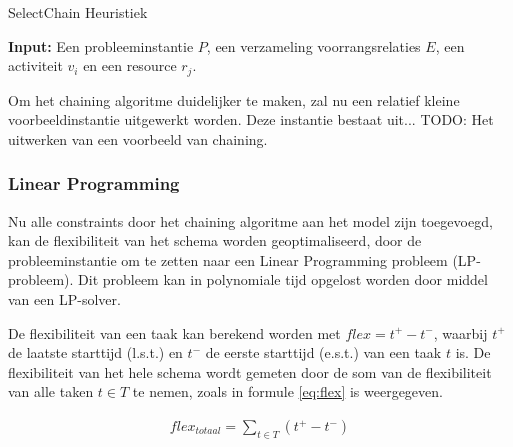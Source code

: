\begin{algorithm}
\caption{SelectChain Heuristiek \cite{policella2004generating}}
\label{alg:selectchain1}
\textbf{Input:} Een probleeminstantie $P$, een verzameling voorrangsrelaties $E$, een activiteit $v_i$ en een resource $r_j$.
\begin{algorithmic}[1]
  	\Else
  	\EndIf
    			\Else
    			\EndIf
    		\EndFor
    	\EndIf
  \EndFunction
\end{algorithmic}
\end{algorithm}

Om het chaining algoritme duidelijker te maken, zal nu een relatief kleine voorbeeldinstantie uitgewerkt worden. Deze instantie bestaat uit...
TODO: Het uitwerken van een voorbeeld van chaining.

\subsubsection{Linear Programming}
\label{subsubsec:flexoplossing}
Nu alle constraints door het chaining algoritme aan het model zijn toegevoegd, kan de flexibiliteit van het schema worden geoptimaliseerd, door de probleeminstantie om te zetten naar een Linear Programming probleem (LP-probleem). Dit probleem kan in polynomiale tijd opgelost worden door middel van een LP-solver.

De flexibiliteit van een taak kan berekend worden met $flex = t^+ - t^-$, waarbij $t^+$ de laatste starttijd (l.s.t.) en $t^-$ de eerste starttijd (e.s.t.) van een taak $t$ is. De flexibiliteit van het hele schema wordt gemeten door de som van de flexibiliteit van alle taken $t \in T$ te nemen, zoals in formule \ref{eq:flex} is weergegeven. 

\begin{align}
\label{eq:flex}
    flex_{totaal} = \sum_{t \in T} (t^+ - t^-)
\end{align}

